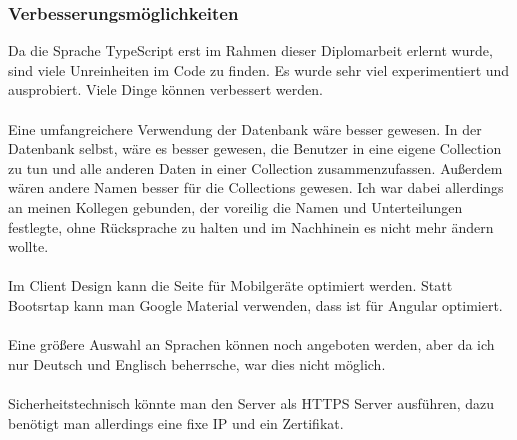 \subsubsection{Verbesserungsmöglichkeiten}
\label{sec:verbesserung}
Da die Sprache TypeScript erst im Rahmen dieser Diplomarbeit erlernt wurde, sind viele Unreinheiten im Code zu finden. Es wurde sehr viel experimentiert und ausprobiert. Viele Dinge können verbessert werden. \\ \\
Eine umfangreichere Verwendung der Datenbank wäre besser gewesen. In der Datenbank selbst, wäre es besser gewesen, die Benutzer in eine eigene Collection zu tun und alle anderen Daten in einer Collection zusammenzufassen. Außerdem wären andere Namen besser für die Collections gewesen. Ich war dabei allerdings an meinen Kollegen gebunden, der voreilig die Namen und Unterteilungen festlegte, ohne Rücksprache zu halten und im Nachhinein es nicht mehr ändern wollte. \\ \\
Im Client Design kann die Seite für Mobilgeräte optimiert werden. Statt Bootsrtap kann man Google Material verwenden, dass ist für Angular optimiert. \\ \\
Eine größere Auswahl an Sprachen können noch angeboten werden, aber da ich nur Deutsch und Englisch beherrsche, war dies nicht möglich. \\ \\
Sicherheitstechnisch könnte man den Server als \ac{HTTPS} Server ausführen, dazu benötigt man allerdings eine fixe IP und ein Zertifikat.